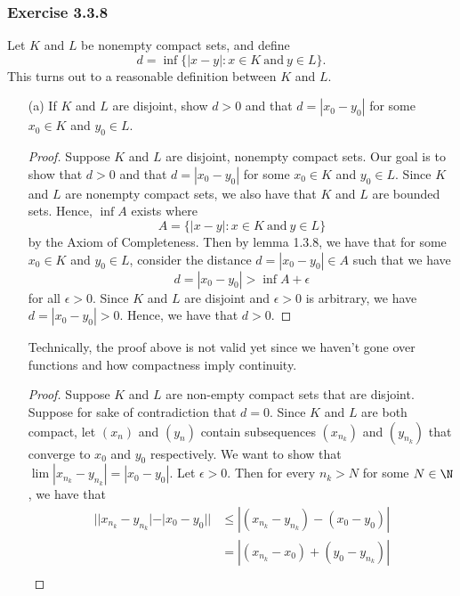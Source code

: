 \subsubsection{Exercise 3.3.8} Let \( K  \) and \( L  \) be nonempty compact sets, and define 
\[ d = \inf \{ | x - y  | : x \in K ~ \text{and} ~ y \in L \}.  \]
This turns out to a reasonable definition between \( K \) and \( L \). 
\begin{enumerate}
    \item[(a)] If \( K  \) and \( L \) are disjoint, show \( d > 0  \) and that \( d = | x_0 - y_0 |  \) for some \( x_0 \in K \) and \( y_0 \in L \).
        \begin{proof}
        Suppose \( K \) and \( L \) are disjoint, nonempty compact sets. Our goal is to show that \( d > 0  \) and that \( d = | x_0 - y_0  |  \) for some \( x_0 \in K  \) and \( y_0 \in L \). Since \( K \) and \( L \) are nonempty compact sets, we also have that \( K \) and \( L \) are bounded sets. Hence, \( \inf A \) exists where 
        \[ A = \{ | x - y | : x \in K ~ \text{and} ~ y \in L \}  \]
by the Axiom of Completeness. Then by lemma 1.3.8, we have that for some \( x_0 \in K \) and \( y_0 \in L \), consider the distance \( d = | x_0 - y_0  | \in A   \) such that we have
\[ d = | x_0 - y_0  | > \inf A + \epsilon  \]
for all \( \epsilon > 0  \). Since \( K \) and \( L \) are disjoint and \( \epsilon > 0  \) is arbitrary, we have \(d =  |x_0 - y_0  | > 0  \). Hence, we have that \( d > 0  \).
        \end{proof}
        Technically, the proof above is not valid yet since we haven't gone over functions and how compactness imply continuity.
        \begin{proof}
            Suppose \( K \) and \( L \) are non-empty compact sets that are disjoint. Suppose for sake of contradiction that \( d = 0  \). Since \( K \) and \( L \) are both compact, let \( (x_n) \) and \( (y_n) \) contain subsequences \( (x_{n_k}) \) and \( (y_{n_k}) \) that converge to \( x_0  \) and \( y_0 \) respectively. We want to show that \( \lim | x_{n_k} - y_{n_k} | = | x_0 - y_0 |  \). Let \( \epsilon > 0  \). Then for every \( n_k > N  \) for some \( N \in \N \), we have that 
            \begin{align*}
                | | x_{n_k} - y_{n_k}| - | x_0 - y_0 |   | &\leq | (x_{n_k} - y_{n_k}) - (x_0 - y_0) |  \\
                                                           &= | (x_{n_k} - x_0) + (y_0- y_{n_k}) |  \\

\end{align*}
\end{proof}
\end{enumerate}
